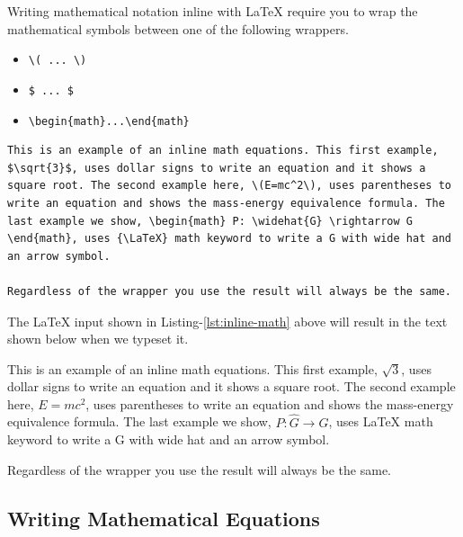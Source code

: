 Writing mathematical notation inline with {\LaTeX} require you to wrap the mathematical symbols between one of the following wrappers. 

\begin{itemize}
    \item \verb|\( ... \)|
    \item \verb|$ ... $|
    \item \verb|\begin{math}...\end{math}|
\end{itemize}


\begin{lstlisting}[language=Tex,style=mystyle,caption={Sample Paragraph with Inline Math Equations},label={lst:inline-math}]
This is an example of an inline math equations. This first example, $\sqrt{3}$, uses dollar signs to write an equation and it shows a square root. The second example here, \(E=mc^2\), uses parentheses to write an equation and shows the mass-energy equivalence formula. The last example we show, \begin{math} P: \widehat{G} \rightarrow G \end{math}, uses {\LaTeX} math keyword to write a G with wide hat and an arrow symbol. 

Regardless of the wrapper you use the result will always be the same. 
\end{lstlisting}

The {\LaTeX} input shown in Listing-\ref{lst:inline-math} above will result in the text shown below when we typeset it. 

This is an example of an inline math equations. This first example, $\sqrt{3}$, uses dollar signs to write an equation and it shows a square root. The second example here, \(E=mc^2\), uses parentheses to write an equation and shows the mass-energy equivalence formula. The last example we show, \begin{math} P: \widehat{G} \rightarrow G \end{math}, uses {\LaTeX} math keyword to write a G with wide hat and an arrow symbol. 

Regardless of the wrapper you use the result will always be the same. 

\subsection{Writing Mathematical Equations}
\label{sub:writing_mathematical_equations}

